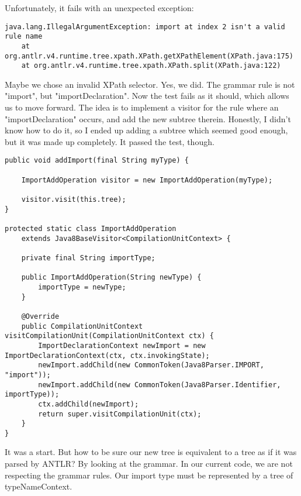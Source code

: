\documentclass[11pt]{article}
\begin{document}
Unfortunately, it fails with an unexpected exception:

\begin{verbatim}
java.lang.IllegalArgumentException: import at index 2 isn't a valid rule name
    at org.antlr.v4.runtime.tree.xpath.XPath.getXPathElement(XPath.java:175)
    at org.antlr.v4.runtime.tree.xpath.XPath.split(XPath.java:122)
\end{verbatim}

Maybe we chose an invalid XPath selector. Yes, we did. The grammar rule is not "import", but "importDeclaration".
Now the test fails as it should, which allows us to move forward. The idea is to implement a visitor for the rule where
an "importDeclaration" occurs, and add the new subtree therein. Honestly, I didn't know how to do it, so I ended up
adding a subtree which seemed good enough, but it was made up completely. It passed the test, though.

\begin{verbatim}
public void addImport(final String myType) {

    ImportAddOperation visitor = new ImportAddOperation(myType);

    visitor.visit(this.tree);
}

protected static class ImportAddOperation
    extends Java8BaseVisitor<CompilationUnitContext> {

    private final String importType;

    public ImportAddOperation(String newType) {
        importType = newType;
    }

    @Override
    public CompilationUnitContext visitCompilationUnit(CompilationUnitContext ctx) {
        ImportDeclarationContext newImport = new ImportDeclarationContext(ctx, ctx.invokingState);
        newImport.addChild(new CommonToken(Java8Parser.IMPORT, "import"));
        newImport.addChild(new CommonToken(Java8Parser.Identifier, importType));
        ctx.addChild(newImport);
        return super.visitCompilationUnit(ctx);
    }
}
\end{verbatim}

It was a start. But how to be sure our new tree is equivalent to a tree as if it was parsed by ANTLR? By looking at the grammar.
In our current code, we are not respecting the grammar rules. Our import type must be represented by a tree of typeNameContext.
\end{document}
